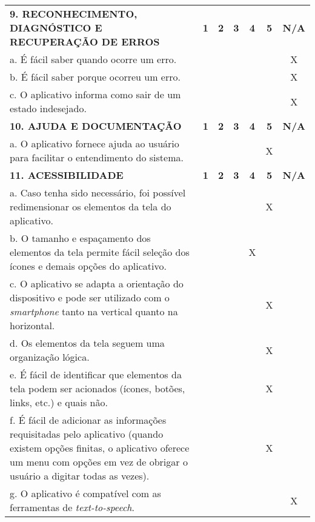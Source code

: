 \documentclass[portuguese,oneside]{tcc}
\begin{document}
\begin{center}
\begin{longtabu}{|L{25em}|c|c|c|c|c|c|}
																																	\textbf{9. RECONHECIMENTO, DIAGNÓSTICO E RECUPERAÇÃO DE ERROS} & \textbf{1} & \textbf{2} & \textbf{3} & \textbf{4} & \textbf{5} & \textbf{N/A} \\ 
																																	a. É fácil saber quando ocorre um erro.	& & & & & & X \\ 
																																	b. É fácil saber porque ocorreu um erro. & & & & & & X \\ 
																																	c. O aplicativo informa como sair de um estado indesejado. & & & & & & X \\ 
																																	\textbf{10. AJUDA E DOCUMENTAÇÃO} & \textbf{1} & \textbf{2} & \textbf{3} & \textbf{4} & \textbf{5} & \textbf{N/A} \\ 
																																	a. O aplicativo fornece ajuda ao usuário para facilitar o entendimento do sistema. & & & & & X & \\ 
																																	\textbf{11. ACESSIBILIDADE} & \textbf{1} & \textbf{2} & \textbf{3} & \textbf{4} & \textbf{5} & \textbf{N/A} \\ 
																																	a. Caso tenha sido necessário, foi possível redimensionar os elementos da tela do aplicativo. & & & & & X & \\ 
																																	b. O tamanho e espaçamento dos elementos da tela permite fácil seleção dos ícones e demais opções do aplicativo. & & & & X & & \\ 
																																	c. O aplicativo se adapta a orientação do dispositivo e pode ser utilizado com o \emph{smartphone} tanto na vertical quanto na horizontal. & & & & & X & \\ 
																																	d. Os elementos da tela seguem uma organização lógica. & & & & & X & \\ 
																																	e. É fácil de identificar que elementos da tela podem ser acionados (ícones, botões, links, etc.) e quais não. & & & & & X & \\ 
																																	f. É fácil de adicionar as informações requisitadas pelo aplicativo (quando existem opções finitas, o aplicativo oferece um menu com opções em vez de obrigar o usuário a digitar todas as vezes). & & & & & X & \\ 
																																	g. O aplicativo é compatível com as ferramentas de \emph{text-to-speech}. & & & & & & X \\ 

\end{longtabu}
\end{center}
\end{document}
